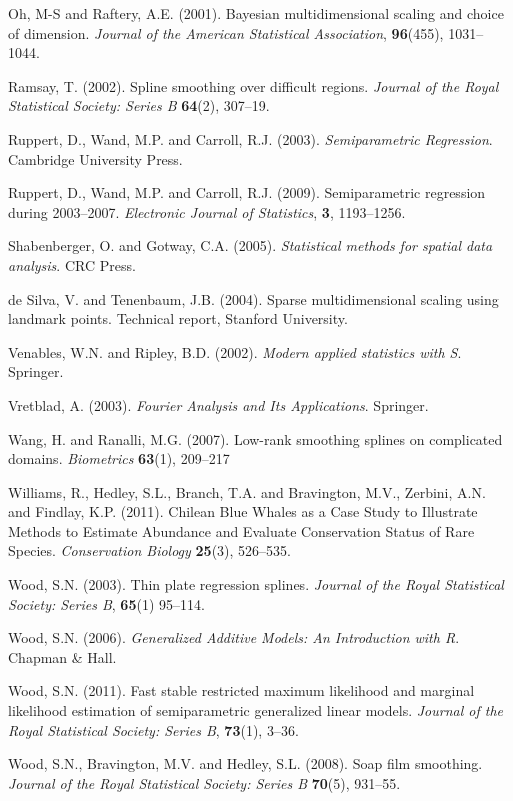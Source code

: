 \documentclass[useAMS, referee]{biom}
\begin{document}
\begin{thebibliography}{99}
\bibitem{} Oh, M-S and Raftery, A.E. (2001). Bayesian multidimensional scaling and choice of dimension. \textit{Journal of the American Statistical Association}, \textbf{96}(455), 1031--1044.

\bibitem{} Ramsay, T. (2002). Spline smoothing over difficult regions. \textit{Journal of the Royal Statistical Society: Series B} \textbf{64}(2), 307--19.

\bibitem{} Ruppert, D., Wand, M.P. and Carroll, R.J. (2003). \textit{Semiparametric Regression}. Cambridge University Press.

\bibitem{} Ruppert, D., Wand, M.P. and Carroll, R.J. (2009). Semiparametric regression during 2003--2007. \textit{Electronic Journal of Statistics}, \textbf{3}, 1193--1256.


\bibitem{} Shabenberger, O. and Gotway, C.A. (2005). \textit{Statistical methods for spatial data analysis}. CRC Press.

\bibitem{} de Silva, V. and Tenenbaum, J.B. (2004). Sparse multidimensional scaling using landmark points. Technical report, Stanford University.

\bibitem{} Venables, W.N. and Ripley, B.D. (2002). \textit{Modern applied statistics with S}. Springer.

\bibitem{} Vretblad, A. (2003). \textit{Fourier Analysis and Its Applications}. Springer.

\bibitem{} Wang, H. and Ranalli, M.G. (2007). Low-rank smoothing splines on complicated domains. \textit{Biometrics} \textbf{63}(1), 209--217

\bibitem{} Williams, R., Hedley, S.L., Branch, T.A. and Bravington, M.V., Zerbini, A.N. and Findlay, K.P. (2011). Chilean Blue Whales as a Case Study to Illustrate Methods to Estimate Abundance and Evaluate Conservation Status of Rare Species. \textit{Conservation Biology} \textbf{25}(3), 526--535.

\bibitem{} Wood, S.N. (2003). Thin plate regression splines. \textit{Journal of the Royal Statistical Society: Series B}, \textbf{65}(1) 95--114.

\bibitem{} Wood, S.N. (2006). \textit{Generalized Additive Models: An Introduction with R}. Chapman \& Hall.

\bibitem{} Wood, S.N. (2011). Fast stable restricted maximum likelihood and marginal likelihood estimation of semiparametric generalized linear models. \textit{Journal of the Royal Statistical Society: Series B}, \textbf{73}(1), 3--36.

\bibitem{} Wood, S.N., Bravington, M.V. and Hedley, S.L. (2008). Soap film smoothing. \textit{Journal of the Royal Statistical Society: Series B} \textbf{70}(5), 931--55.

\end{thebibliography}

\label{lastpage}
\end{document}
